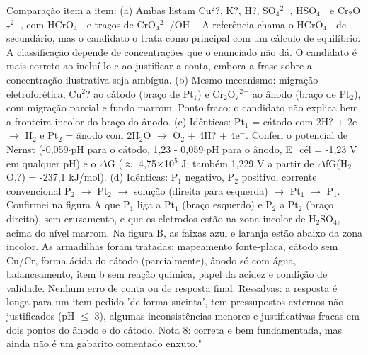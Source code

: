 \documentclass{article}%
\begin{document}
Comparação item a item: (a) Ambas listam Cu$^2$?, K?, H?, SO$_{4}$$^2$$^{-}$, HSO$_{4}$$^{-}$ e Cr$_{2}$O$_{7}$$^2$$^{-}$, com HCrO$_{4}$$^{-}$ e traços de CrO$_{4}$$^2$$^{-}$/OH$^{-}$. A referência chama o HCrO$_{4}$$^{-}$ de secundário, mas o candidato o trata como principal com um cálculo de equilíbrio. A classificação depende de concentrações que o enunciado não dá. O candidato é mais correto ao incluí{-}lo e ao justificar a conta, embora a frase sobre a concentração ilustrativa seja ambígua. (b) Mesmo mecanismo: migração eletroforética, Cu$^2$? ao cátodo (braço de Pt$_{1}$) e Cr$_{2}$O$_{7}$$^2$$^{-}$ ao ânodo (braço de Pt$_{2}$), com migração parcial e fundo marrom. Ponto fraco: o candidato não explica bem a fronteira incolor do braço do ânodo. (c) Idênticas: Pt$_{1}$ = cátodo com 2H? + 2e$^{-}$ $\to$ H$_{2}$ e Pt$_{2}$ = ânodo com 2H$_{2}$O $\to$ O$_{2}$ + 4H? + 4e$^{-}$. Conferi o potencial de Nernst (-0,059$\cdot$pH para o cátodo, 1,23 - 0,059$\cdot$pH para o ânodo, E\_cél = -1,23 V em qualquer pH) e o $\Delta$G ($\approx$ 4,75$\times$10$^{5}$ J; também 1,229 V a partir de $\Delta$fG(H$_{2}$O,?) = -237,1 kJ/mol). (d) Idênticas: P$_{1}$ negativo, P$_{2}$ positivo, corrente convencional P$_{2}$ $\to$ Pt$_{2}$ $\to$ solução (direita para esquerda) $\to$ Pt$_{1}$ $\to$ P$_{1}$. Confirmei na figura A que P$_{1}$ liga a Pt$_{1}$ (braço esquerdo) e P$_{2}$ a Pt$_{2}$ (braço direito), sem cruzamento, e que os eletrodos estão na zona incolor de H$_{2}$SO$_{4}$, acima do nível marrom. Na figura B, as faixas azul e laranja estão abaixo da zona incolor. As armadilhas foram tratadas: mapeamento fonte{-}placa, cátodo sem Cu/Cr, forma ácida do cátodo (parcialmente), ânodo só com água, balanceamento, item b sem reação química, papel da acidez e condição de validade. Nenhum erro de conta ou de resposta final. Ressalvas: a resposta é longa para um item pedido 'de forma sucinta', tem pressupostos externos não justificados (pH $\leq$ 3), algumas inconsistências menores e justificativas fracas em dois pontos do ânodo e do cátodo. Nota 8: correta e bem fundamentada, mas ainda não é um gabarito comentado enxuto."%
$$
\end{document}
